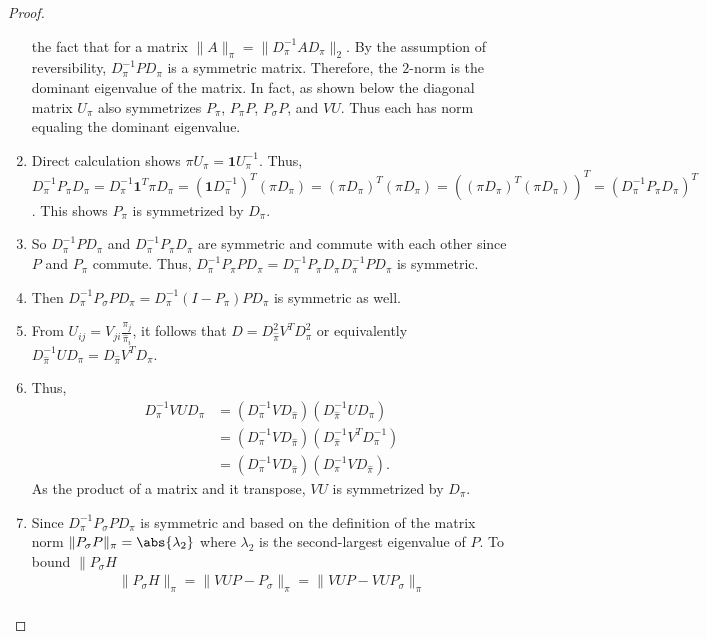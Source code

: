 \documentclass[12pt]{article}
\begin{document}
\begin{proof}
\begin{enumerate}
    the fact that for a matrix \( \| A \|_{\pi} = \| D_{\pi}^{-1} A
    D_{\pi} \|_{2} \).  By the assumption of reversibility,  $D_{\pi}^{-1} P
    D_{\pi}$ is a symmetric matrix.  Therefore, the $2$-norm is the
    dominant eigenvalue of the matrix.  In fact, as shown below the
    diagonal matrix $U_{\pi}$ also symmetrizes $P_{\pi}$, $P_{\pi}P$,
    $P_{\sigma}P$, and $VU$.  Thus each has norm equaling the dominant
    eigenvalue.
  \item Direct calculation shows $\pi U_{\pi} = \mathbf{1}
    U_{\pi}^{-1}$. Thus, $D_{\pi}^{-1} P_{\pi} D_{\pi} = D_{\pi}^{-1}
    \mathbf{1}^{T} \pi D_{\pi} = (\mathbf{1} D_{\pi}^{-1})^T(\pi
    D_{\pi}) = (\pi D_{\pi})^T(\pi D_{\pi}) = ( (\pi D_{\pi})^T(\pi
    D_{\pi}))^T = (D_{\pi}^{-1} P_{\pi} D_{\pi})^T$.  This shows
    $P_{\pi}$ is symmetrized by $D_{\pi}$.
\item So $D_{\pi}^{-1} P D_{\pi}$ and $D_{\pi}^{-1} P_{\pi} D_{\pi}$
  are symmetric and commute with each other since $P$ and $P_{\pi}$
  commute.  Thus, $D_{\pi}^{-1} P_{\pi} P D_{\pi} = D_{\pi}^{-1}
  P_{\pi} D_{\pi} D_{\pi}^{-1} P D_{\pi}$ is symmetric.
\item Then $D_{\pi}^{-1} P_{\sigma} P D_{\pi} = D_{\pi}^{-1}
  (I-P_{\pi}) P D_{\pi}$ is symmetric as well.
\item From $U_{ij} = V_{ji} \frac{\pi_j}{\hat{\pi}_{i}}$, it follows
  that $D = D_{\hat{\pi}}^2 V^T D_{\pi}^2$ or equivalently
  $D_{\hat{\pi}}^{-1} U D_{\pi} = D_{\hat{\pi}} V^T D_{\pi}$.
\item Thus,
  \begin{align*}
    D_{\pi}^{-1} VU D_{\pi} &= (D_{\pi}^{-1} V
                              D_{\hat{\pi}})(D_{\hat{\pi}}^{-1} U
                              D_{\pi}) \\
    &= (D_{\pi}^{-1} V D_{\hat{\pi}})(D_{\hat{\pi}}^{-1} V^T D_{\pi}^{-1}) \\
    &= (D_{\pi}^{-1} V D_{\hat{\pi}})(D_{\pi}^{-1} V D_{\hat{\pi}}).
  \end{align*}
  As the product of a matrix and it transpose, $VU$ is symmetrized by
  $D_{\pi}$.
\item Since $D_{\pi}^{-1} P_{\sigma} P D_{\pi}$ is symmetric and based
  on the definition of the matrix norm $\| P_{\sigma} P \|_{\pi} =
  \abs{\lambda_2}$ where $\lambda_2$ is the second-largest eigenvalue
  of $P$.  To bound $\| P_{\sigma} H$
  \begin{multline*}
    \| P_{\sigma} H \|_{\pi} = \| VUP - P_{\sigma} \|_{\pi} = \| VUP -
    VUP_{\sigma}\|_{\pi} \\

\end{multline*}
\end{enumerate}
\end{proof}
\end{document}
